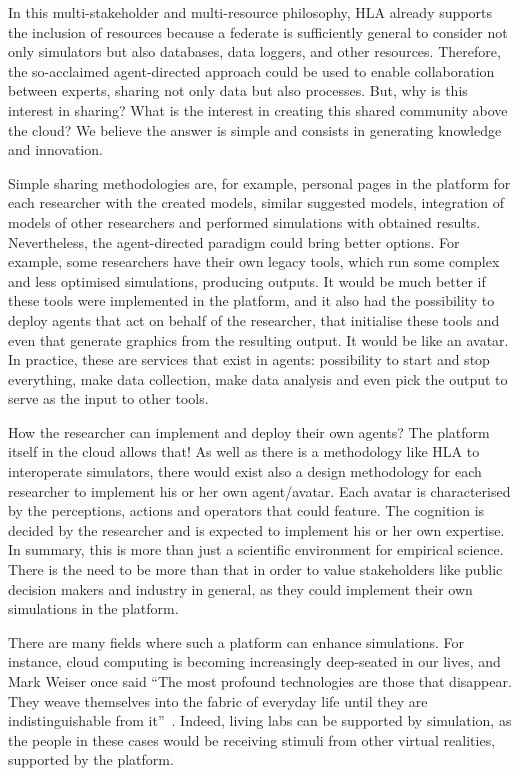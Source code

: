 \documentclass[conference]{IEEEtran}
\begin{document}
In this multi-stakeholder and multi-resource philosophy, HLA already supports the inclusion of resources because a federate is sufficiently general to consider not only simulators but also databases, data loggers, and other resources. Therefore, the so-acclaimed agent-directed approach could be used to enable collaboration between experts, sharing not only data but also processes. But, why is this interest in sharing? What is the interest in creating this shared community above the cloud? We believe the answer is simple and consists in generating knowledge and innovation.

Simple sharing methodologies are, for example, personal pages in the platform for each researcher with the created models, similar suggested models, integration of models of other researchers and performed simulations with obtained results. Nevertheless, the agent-directed paradigm could bring better options. For example, some researchers have their own legacy tools, which run some complex and less optimised simulations, producing outputs. It would be much better if these tools were implemented in the platform, and it also had the possibility to deploy agents that act on behalf of the researcher, that initialise these tools and even that generate graphics from the resulting output. It would be like an avatar. In practice, these are services that exist in agents: possibility to start and stop everything, make data collection, make data analysis and even pick the output to serve as the input to other tools.

How the researcher can implement and deploy their own agents? The platform itself in the cloud allows that! As well as there is a methodology like HLA to interoperate simulators, there would exist also a design methodology for each researcher to implement his or her own agent/avatar. Each avatar is characterised by the perceptions, actions and operators that could feature. The cognition is decided by the researcher and is expected to implement his or her own expertise. In summary, this is more than just a scientific environment for empirical science. There is the need to be more than that in order to value stakeholders like public decision makers and industry in general, as they could implement their own simulations in the platform.

There are many fields where such a platform can enhance simulations. For instance, cloud computing is becoming increasingly deep-seated in our lives, and Mark Weiser once said ``The most profound technologies are those that disappear. They weave themselves into the fabric of everyday life until they are indistinguishable from it''~\cite{weiser1991computer}. Indeed, living labs can be supported by simulation, as the people in these cases would be receiving stimuli from other virtual realities, supported by the platform.
\end{document}
